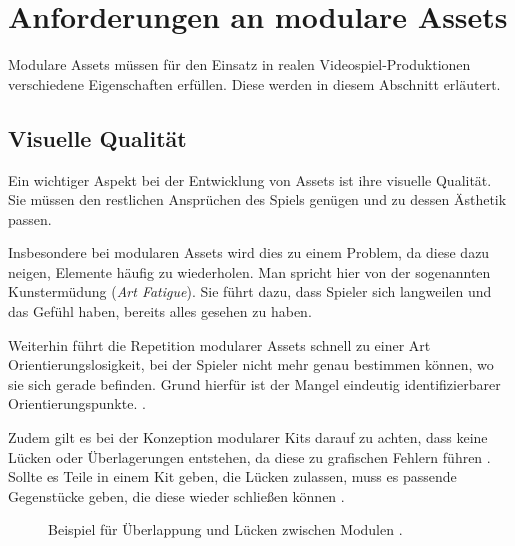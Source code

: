 \section{Anforderungen an modulare Assets}
Modulare Assets müssen für den Einsatz in realen Videospiel-Produktionen verschiedene Eigenschaften erfüllen. Diese werden in diesem Abschnitt erläutert.
\subsection{Visuelle Qualität}\label{vqualitaet}
Ein wichtiger Aspekt bei der Entwicklung von Assets ist ihre visuelle Qualität. Sie müssen den restlichen Ansprüchen des Spiels genügen und zu dessen Ästhetik passen.
\par
Insbesondere bei modularen Assets wird dies zu einem Problem, da diese dazu neigen, Elemente häufig zu wiederholen. Man spricht hier von der sogenannten Kunstermüdung (\textit{Art Fatigue}). Sie führt dazu, dass Spieler sich langweilen und das Gefühl haben, bereits alles gesehen zu haben. \parencite{Burgess}
\par
Weiterhin führt die Repetition modularer Assets schnell zu einer Art Orientierungslosigkeit, bei der Spieler nicht mehr genau bestimmen können, wo sie sich gerade befinden. Grund hierfür ist der Mangel eindeutig identifizierbarer Orientierungspunkte. \parencite{unrealModular}.
\par
Zudem gilt es bei der Konzeption modularer Kits darauf zu achten, dass keine Lücken oder Überlagerungen entstehen, da diese zu grafischen Fehlern führen \parencite{Mader}. Sollte es Teile in einem Kit geben, die Lücken zulassen, muss es passende Gegenstücke geben, die diese wieder schließen können \parencite{Burgess}.
 \begin{figure}[!h]
\centering
  \caption{Beispiel für Überlappung und Lücken zwischen Modulen \parencite{Mader}.}
	\label{glitch}
\end{figure}
